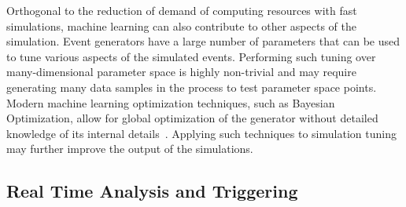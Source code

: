 \medskip

Orthogonal to the reduction of demand of computing resources with fast simulations, machine learning can also contribute to other aspects of the simulation. Event generators have a large number of parameters that can be used to tune various aspects of the simulated events. Performing such tuning over many-dimensional parameter space is highly non-trivial and may require generating many data samples in the process to test parameter space points.  Modern machine learning optimization techniques, such as Bayesian Optimization, allow for global optimization of the generator without detailed knowledge of its internal details~\cite{Ilten:2016csi}. Applying such techniques to simulation tuning may further improve the output of the simulations.



\subsection{Real Time Analysis and Triggering}
\label{sec:real-time-analysis}

